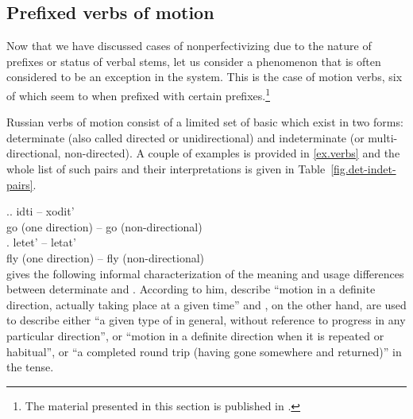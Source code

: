 \subsection{Prefixed verbs of motion}\label{subsection:perf:motion}

Now that we have discussed cases of nonperfectivizing  due to the nature of prefixes or  status of verbal stems, let us consider a phenomenon that is often considered to be an exception in the  system. This is the case of motion verbs, six of which seem to  when prefixed with certain prefixes.\footnote{The material presented in this section is published in \cite{ZinovaOsswald:paper}.}

Russian verbs of motion consist of a limited set of basic  which exist in two forms: determinate (also called directed or unidirectional) and indeterminate (or multi-directional, non-directed). A couple of examples is provided in \ref{ex.verbs} and the whole list of such pairs and their interpretations is given in Table~\ref{fig.det-indet-pairs}.

\ex.\label{ex.verbs}\ag. idti -- xodit'\\
{go (one direction)} -- {go (non-directional)}\\
\bg. letet' -- letat'\\
{fly (one direction)} -- {fly (non-directional)}\\

\citet[3f]{Stilman:51} gives the following informal characterization of the meaning and usage differences between determinate and . According to him,  describe ``motion in a definite direction, actually taking place at a given time'' and , on the other hand, are used to describe either ``a given type of  in general, without reference to progress in any particular direction'', or ``motion in a definite direction when it is repeated or habitual'', or ``a completed round trip (having gone somewhere and returned)'' in the  tense.\largerpage

